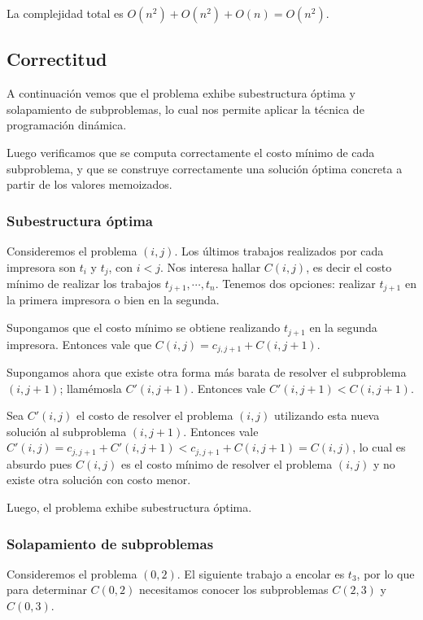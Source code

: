 \documentclass[a4paper, 10pt, twoside]{article}
\begin{document}
La complejidad total es $O(n^2) + O(n^2) + O(n) = O(n^2)$.


\subsection{Correctitud}

A continuación vemos que el problema exhibe subestructura óptima y solapamiento de subproblemas, lo cual nos permite aplicar la técnica de programación dinámica.

Luego verificamos que se computa correctamente el costo mínimo de cada subproblema, y que se construye correctamente una solución óptima concreta a partir de los valores memoizados.


\subsubsection{Subestructura óptima}

Consideremos el problema $(i, j)$. Los últimos trabajos realizados por cada impresora son $t_i$ y $t_j$, con $i < j$. Nos interesa hallar $C(i, j)$, es decir el costo mínimo de realizar los trabajos $t_{j + 1}, \cdots, t_n$. Tenemos dos opciones: realizar $t_{j + 1}$ en la primera impresora o bien en la segunda.

Supongamos que el costo mínimo se obtiene realizando $t_{j + 1}$ en la segunda impresora. Entonces vale que $C(i, j) = c_{j, j + 1} + C(i, j + 1)$.

Supongamos ahora que existe otra forma más barata de resolver el subproblema $(i, j + 1)$; llamémosla $C'(i, j + 1)$. Entonces vale $C'(i, j + 1) < C(i, j + 1)$.

Sea $C'(i, j)$ el costo de resolver el problema $(i, j)$ utilizando esta nueva solución al subproblema $(i, j + 1)$. Entonces vale $C'(i, j) = c_{j, j + 1} + C'(i, j + 1) < c_{j, j + 1} + C(i, j + 1) = C(i, j)$, lo cual es absurdo pues $C(i, j)$ es el costo mínimo de resolver el problema $(i, j)$ y no existe otra solución con costo menor.

Luego, el problema exhibe subestructura óptima.


\subsubsection{Solapamiento de subproblemas}

Consideremos el problema $(0, 2)$. El siguiente trabajo a encolar es $t_3$, por lo que para determinar $C(0, 2)$ necesitamos conocer los subproblemas $C(2, 3)$ y $C(0, 3)$.
\end{document}
